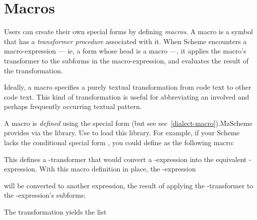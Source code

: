 
\chapter{Macros}
\label{sugar}

Users can create their own special forms by defining
{\em macros}.  A macro is a symbol that has a {\em
transformer procedure} associated with it.  When Scheme
encounters a macro-expression --- ie, a form whose
head is a macro ---, it applies the macro's transformer
to the subforms in the macro-expression, and evaluates
the result of the transformation.

Ideally, a macro specifies a purely textual
transformation from code text to other code text.  This
kind of transformation is useful for abbreviating an
involved and perhaps frequently occurring textual
pattern.



A macro is {\em defined} using the special form
 (but see
sec~\ref{dialect-macro}).\f{MzScheme provides
 via the  library.  Use  to load this library.}
For example, if your Scheme lacks the conditional
special form , you could define
 as the following macro:



\n This defines a  -transformer that would
convert a -expression into the equivalent
-expression.   With this macro definition in
place, the -expression 


\n will be converted to another expression, the result
of applying the
-transformer to the -expression's
subforms:


\n The transformation yields the list

